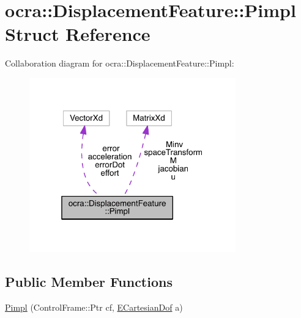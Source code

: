 \hypertarget{structocra_1_1DisplacementFeature_1_1Pimpl}{}\section{ocra\+:\+:Displacement\+Feature\+:\+:Pimpl Struct Reference}
\label{structocra_1_1DisplacementFeature_1_1Pimpl}


Collaboration diagram for ocra\+:\+:Displacement\+Feature\+:\+:Pimpl\+:\nopagebreak
\begin{figure}[H]
\begin{center}
\leavevmode
\includegraphics[width=253pt]{d1/d74/structocra_1_1DisplacementFeature_1_1Pimpl__coll__graph}
\end{center}
\end{figure}
\subsection*{Public Member Functions}
\begin{DoxyCompactItemize}
\item 
\hyperlink{structocra_1_1DisplacementFeature_1_1Pimpl_a74a8e0493ff78e399aef5f07e4a092e3}{Pimpl} (Control\+Frame\+::\+Ptr cf, \hyperlink{namespaceocra_a436781c7059a0f76027df1c652126260}{E\+Cartesian\+Dof} a)
\end{DoxyCompactItemize}
